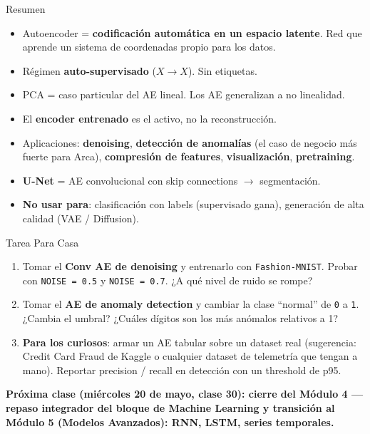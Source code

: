\documentclass[aspectratio=169, 11pt]{beamer}
\begin{document}
\begin{frame}[shrink]{Resumen}
  \vspace{6pt}
  \begin{itemize}\setlength\itemsep{3pt}
    \item Autoencoder = \textbf{codificación automática en un espacio latente}. Red que aprende un sistema de coordenadas propio para los datos.
    \item Régimen \textbf{auto-supervisado} ($X \to X$). Sin etiquetas.
    \item PCA = caso particular del AE lineal. Los AE generalizan a no linealidad.
    \item El \textbf{encoder entrenado} es el activo, no la reconstrucción.
    \item Aplicaciones: \textbf{denoising}, \textbf{detección de anomalías} (el caso de negocio más fuerte para Arca), \textbf{compresión de features}, \textbf{visualización}, \textbf{pretraining}.
    \item \textbf{U-Net} = AE convolucional con skip connections $\to$ segmentación.
    \item \textbf{No usar para}: clasificación con labels (supervisado gana), generación de alta calidad (VAE / Diffusion).
  \end{itemize}
\end{frame}

\begin{frame}[shrink]{Tarea Para Casa}
  \vspace{6pt}
  \begin{enumerate}\setlength\itemsep{6pt}
    \item Tomar el \textbf{Conv AE de denoising} y entrenarlo con \texttt{Fashion-MNIST}. Probar con \texttt{NOISE = 0.5} y \texttt{NOISE = 0.7}. ¿A qué nivel de ruido se rompe?
    \item Tomar el \textbf{AE de anomaly detection} y cambiar la clase ``normal'' de \texttt{0} a \texttt{1}. ¿Cambia el umbral? ¿Cuáles dígitos son los más anómalos relativos a 1?
    \item \textbf{Para los curiosos}: armar un AE tabular sobre un dataset real (sugerencia: Credit Card Fraud de Kaggle o cualquier dataset de telemetría que tengan a mano). Reportar precision / recall en detección con un threshold de p95.
  \end{enumerate}
  \vspace{10pt}
  {\footnotesize\color{arcaDark}\bfseries
  Próxima clase (miércoles 20 de mayo, clase 30): cierre del Módulo 4 --- repaso integrador del bloque de Machine Learning y transición al Módulo 5 (Modelos Avanzados): RNN, LSTM, series temporales.}
\end{frame}
\end{document}
